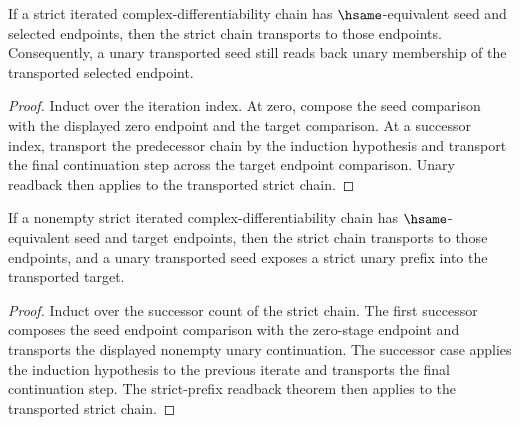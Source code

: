 \begin{theorem}
\label{thm:iterated-strict-cplx-diff-hsame-transport-unary-readback}
If a strict iterated complex-differentiability chain has \(\hsame\)-equivalent
seed and selected endpoints, then the strict chain transports to those
endpoints. Consequently, a unary transported seed still reads back unary
membership of the transported selected endpoint.
\end{theorem}
\begin{proof}
Induct over the iteration index. At zero, compose the seed comparison with
the displayed zero endpoint and the target comparison. At a successor index,
transport the predecessor chain by the induction hypothesis and transport the
final continuation step across the target endpoint comparison. Unary readback
then applies to the transported strict chain.
\end{proof}

\begin{theorem}
\label{thm:iterated-strict-cplx-diff-hsame-transport-strict-prefix}
If a nonempty strict iterated complex-differentiability chain has \(\hsame\)-equivalent seed and target endpoints, then the strict chain transports to those endpoints, and a unary transported seed exposes a strict unary prefix into the transported target.
\end{theorem}
\begin{proof}
Induct over the successor count of the strict chain. The first successor composes the seed endpoint comparison with the zero-stage endpoint and transports the displayed nonempty unary continuation. The successor case applies the induction hypothesis to the previous iterate and transports the final continuation step. The strict-prefix readback theorem then applies to the transported strict chain.
\end{proof}

